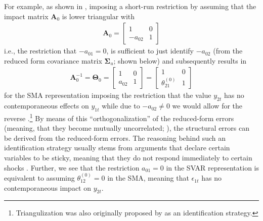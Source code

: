 \documentclass[a4paper,11pt,listof=nochaptergap,oneside,pointednumbers,bibtotoc,bigheadings,liststotoc,hidelinks]{scrbook}
\theoremstyle{mysatz}
\theoremstyle{mydefinition}
\theoremstyle{mytheorem}
\theoremstyle{mybemerkung}
\newcommand{\vect}[1]{\boldsymbol{\mathbf{#1}}}
\begin{document}
For example, as shown in \citet{zivot:00}, imposing a short-run restriction by assuming that the impact matrix $\vect{A}_0$ is lower triangular with
\begin{equation} \label{eq:svar11}
\begin{split}
 		\vect{A}_0 = 	\begin{bmatrix}
    					1 & 0 \\
					-a_{02} & 1
 					\end{bmatrix}
\end{split}								
\end{equation}
i.e., the restriction that $-a_{01}=0$, is sufficient to just identify $-a_{02}$ (from the reduced form covariance matrix $\vect{\Sigma}_u$; shown below) and subsequently results in 
\begin{equation} \label{eq:svar12}
\begin{split}
 		\vect{A}_0^{-1} = \vect{\Theta}_0 = 	
					\begin{bmatrix}
    					1 & 0 \\
					a_{02} & 1
 					\end{bmatrix} = 
						\begin{bmatrix}
    						1 & 0 \\
						\theta_{21}^{(0)} & 1
 						\end{bmatrix}
\end{split}								
\end{equation}
for the SMA representation imposing the restriction that the value $y_{2t}$ has no contemporaneous effects on $y_{1t}$ while due to $-a_{02} \neq 0$ we would allow for the reverse \citep{zivot:00}.\footnote{Triangulization was also originally proposed by \citet{sims:80} as an identification strategy.} By means of this ``orthogonalization'' of the reduced-form errors (meaning, that they become mutually uncorrelated; \citealp{lutkepohlkilian:17}), the structural errors can be derived from the reduced-form errors. The reasoning behind such an identification strategy usually stems from arguments that declare certain variables to be sticky, meaning that they do not respond immediately to certain shocks \citep{whelan:16}. Further, we see that the restriction $a_{01}=0$ in the SVAR representation is equivalent to assuming $\theta_{12}^{(0)}=0$ in the SMA, meaning that $\epsilon_{1t}$ has no contemporaneous impact on $y_{2t}$.
\end{document}
